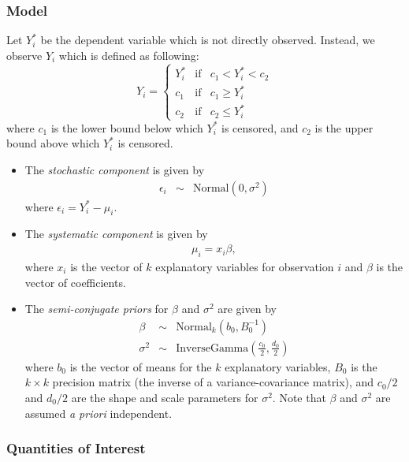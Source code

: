 \subsubsection{Model}
Let $Y_i^*$ be the dependent variable which is not directly observed. Instead,
we observe $Y_i$ which is defined as following:
\begin{equation*}
Y_i = \left\{
\begin{array}{lcl}
Y_i^*  &\textrm{if} & c_1<Y_i^*<c_2 \\
c_1    &\textrm{if} & c_1 \ge Y_i^* \\
c_2    &\textrm{if} & c_2 \le Y_i^*
\end{array}\right.
\end{equation*}
where $c_1$ is the lower bound below which $Y_i^*$ is censored, and
$c_2$ is the upper bound above which $Y_i^*$ is censored.

\begin{itemize}
\item The \emph{stochastic component} is given by 
\begin{eqnarray*} 
\epsilon_{i}  &  \sim & \textrm{Normal}(0, \sigma^2)
\end{eqnarray*} 
where $\epsilon_{i}=Y^*_i-\mu_i$. 

\item The \emph{systematic component} is given by
\begin{eqnarray*}
\mu_{i}= x_{i} \beta,
\end{eqnarray*}
where $x_{i}$ is the vector of $k$ explanatory variables for
observation $i$ and $\beta$ is the vector of coefficients.

\item The \emph{semi-conjugate priors} for $\beta$ and $\sigma^2$ are
given by 
\begin{eqnarray*} 
\beta & \sim & \textrm{Normal}_k \left( b_{0},B_{0}^{-1}\right) \\
\sigma^{2} & \sim & \textrm{InverseGamma} \left( \frac{c_0}{2}, \frac{d_0}{2}
\right) 
\end{eqnarray*}
where $b_{0}$ is the vector of means for the $k$ explanatory
variables, $B_{0}$ is the $k\times k$ precision matrix (the inverse of
a variance-covariance matrix), and $c_0/2$ and $d_0/2$ are the shape
and scale parameters for $\sigma^{2}$.  Note that $\beta$ and
$\sigma^2$ are assumed \emph{a priori} independent.
\end{itemize}

\subsubsection{Quantities of Interest}

